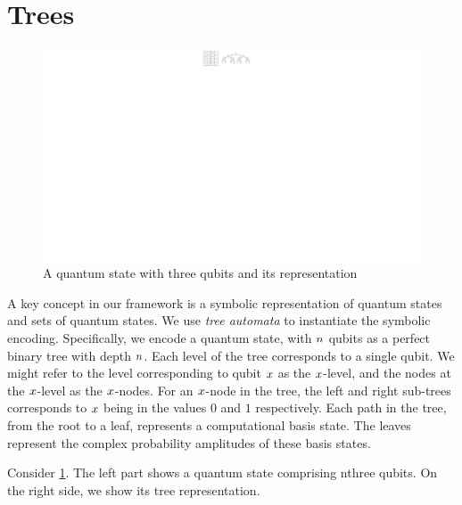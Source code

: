 \section{Trees}
\begin{figure}
\center
\includegraphics[]{Figures/Trees/Tree}
\caption{A quantum state with three qubits and its representation}
\label{qustate:tree:fig}
\end{figure}

A key concept in our framework is a symbolic representation of quantum states and sets of quantum states.
%
We use {\it tree automata} to instantiate the symbolic encoding.
%
Specifically, we encode a quantum state, with $n$ qubits as a perfect binary tree with depth $n$.
%
Each level of the tree corresponds to a single qubit. 
%
We might refer to the level corresponding to qubit $x$ as the $x$-level, and the nodes at the $x$-level as the $x$-nodes.
%
For an $x$-node in the tree,  the left and right sub-trees corresponds to $x$ being in the values $0$ and $1$ respectively.
%
Each path in the tree, from the root to a leaf, represents a computational basis state.
%
The leaves represent the complex probability amplitudes of these basis states.

Consider \cref{qustate:tree:fig}.
%
The left part shows a quantum state comprising nthree qubits.
%
On the right side, we show its tree representation.
%



